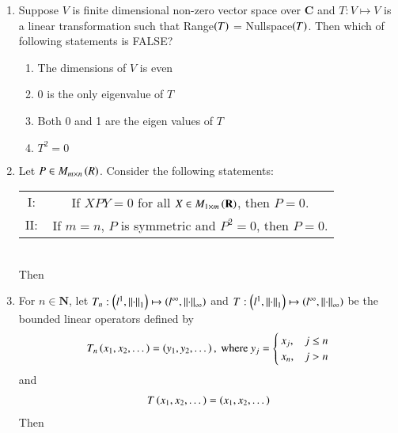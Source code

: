 \documentclass[journal]{IEEEtran}
\numberwithin{equation}{enumi}
\numberwithin{figure}{enumi}
\begin{document}
\begin{enumerate}
		\item
			Suppose $V$ is finite dimensional non-zero vector space over $\mathbf{C}$ and $T: V \mapsto V$ is a linear transformation such that Range$\left(T\right)$ = Nullspace$\left(T\right)$. Then which of following statements is FALSE?
			
			\hfill{}
		
		\begin{enumerate}
			\item The dimensions of $V$ is even 
			\item 0 is the only eigenvalue of $T$
			\item Both 0 and 1 are the eigen values of $T$
			\item $T^2 = 0$
		\end{enumerate}

		\item 
		Let $P \in M_{m \times n}\left(R\right)$. Consider the following statements: \\
		\begin{tabular}{c  c}
			$\mathrm{I:}$ & If $XPY = 0$ for all $X \in M_{1 \times m}\left(\mathbf{R}\right)$, then $P = 0$.\\
			$\mathrm{II:}$ & If $m = n$, $P$ is symmetric and $P^2 = 0$, then $P = 0$. \\
		\end{tabular}\\
		Then 
		
		\hfill{}
		
		\begin{enumerate}
		\end{enumerate}

		\item 
			For $n \in \mathbf{N}$, let $T_n: \left(l^1,\left\lVert\cdot\right\rVert_1\right) \mapsto \left(l^{\infty}, \left\lVert\cdot\right\rVert_{\infty}\right)$ and $T: \left(l^1,\left\lVert\cdot\right\rVert_1\right) \mapsto \left(l^{\infty}, \left\lVert\cdot\right\rVert_{\infty}\right)$ be the bounded linear operators defined by 
		\begin{align*}
			T_n\left(x_1,x_2,\dots\right) = \left(y_1, y_2, \dots\right), \text{ where } y_j = 
			\begin{cases}
				x_j ,& j \leq n\\
				x_n ,& j > n
			\end{cases}\\
		\end{align*}
		and 
		\begin{align*}
			T\left(x_1, x_2, \dots\right) = \left(x_1, x_2, \dots\right)
		\end{align*}
		Then 
		

\end{enumerate}
\end{document}
